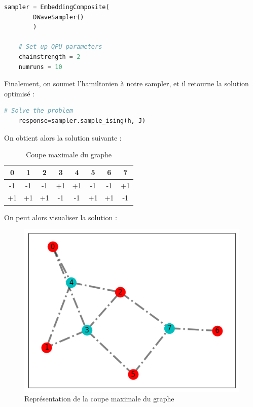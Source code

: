 \documentclass{article}
\begin{document}
\begin{multicols}{2}
\begin{lstlisting}[language=Python]
    sampler = EmbeddingComposite(
        DWaveSampler()
        )
    
    # Set up QPU parameters
    chainstrength = 2
    numruns = 10
\end{lstlisting}

Finalement, on soumet l'hamiltonien à notre sampler, et il retourne la solution optimisé :

\begin{lstlisting}[language=Python]
    # Solve the problem
    response=sampler.sample_ising(h, J) 
\end{lstlisting}

On obtient alors la solution suivante :

\begin{table}[H]
    \centering
    \begin{tabular}{cccccccc}
        \hline
        0 & 1 & 2 & 3 & 4 & 5 & 6 & 7 \\
        \hline
        -1 & -1 & -1 & +1 & +1 & -1 & -1 & +1 \\
        +1 & +1 & +1 & -1 & -1 & +1 & +1 & -1 \\
    \end{tabular}
    \caption{Coupe maximale du graphe}
    \label{tab:Solution}
\end{table}

On peut alors visualiser la solution :

\begin{figure}[H]
    \centering
    \includegraphics[width = \columnwidth]{fig/solution.png}
    \caption{Représentation de la coupe maximale du graphe}
    \label{fig:Graph_solution}
\end{figure}




\end{multicols}
\end{document}
